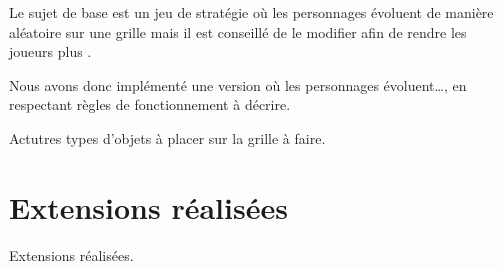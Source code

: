 Le sujet de base est un jeu de stratégie où les personnages évoluent de manière aléatoire sur une grille mais il est conseillé de le modifier afin de rendre les joueurs plus .

Nous avons donc implémenté une version où les personnages évoluent\dots, en respectant \textcolor{cardinal}{règles de fonctionnement à décrire}. 

\textcolor{cardinal}{Actutres types d'objets à placer sur la grille à faire}.


\section{Extensions réalisées}

\textcolor{cardinal}{Extensions réalisées}.

